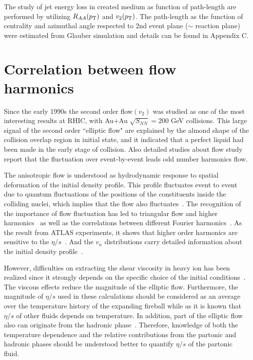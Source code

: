     The study of jet energy loss in created medium as function of path-length are performed by utilizing $R_{AA}(p_{\rm{T}})$ and $v_2(p_{\rm{T}})$.  The path-length as the function of centrality and azimuthal angle respected to 2nd event plane ($\sim$ reaction plane) were estimated from Glauber simulation and details can be found in Appendix C.    
    
    
\clearpage
\section{Correlation between flow harmonics}

 Since the early 1990s the second order flow$(v_2)$ was studied as one of the most interesting results at RHIC, with Au+Au $\sqrt{S_{NN}}=200$ GeV collisions. This large signal of  the second order ``elliptic flow" are explained by the almond shape of the collision overlap region in initial state, and it indicated that a perfect liquid had been made in the early stage of collision. Also detailed studies about flow study report that the fluctuation over event-by-event leads odd number harmonics flow. 
 
 The anisotropic flow is understood as hydrodynamic response to spatial deformation of the initial density profile.
This profile fluctuates event to event due to quantum fluctuations of the positions of the constituents inside the colliding nuclei, which implies that the flow also fluctuates~\cite{Miller:2003kd,Alver:2006wh}.
The recognition of the importance of flow fluctuation has led to triangular flow and higher harmonics~\cite{Alver:2010gr,ALICE:2011ab} as well as the correlations between different Fourier harmonics~\cite{Aad:2014fla}.
 As the result from ATLAS experiments, it shows that higher order harmonics are sensitive to the $\eta/s$~\cite{Luzum:2012wu}.
And the $v_{n}$ distributions carry detailed information about the initial density profile~\cite{Renk:2014jja,Yan:2014nsa}.

However, difficulties on extracting the shear viscosity in heavy ion has been realized since it strongly depends on the specific choice of the initial conditions~\cite{Romatschke:2007mq,Luzum:2012wu,Shen:2011zc}.
The viscous effects reduce the magnitude of the elliptic flow. Furthermore, the magnitude of $\eta/s$ used in these calculations should be considered as an average over the temperature history of the expanding fireball while as it is known that $\eta/s$ of other fluids depends on temperature. 
In addition, part of the elliptic flow also can originate from the hadronic phase~\cite{Bozek:2011ua,Rose:2014fba,Ryu:2015vwa}. Therefore,
knowledge of both the temperature dependence and the relative contributions from the partonic and hadronic phases should be understood better to quantify $\eta/s$ of the partonic fluid.

